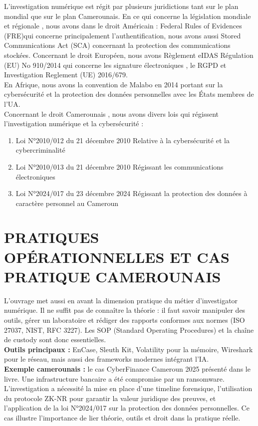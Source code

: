 \documentclass[12pt,a4paper]{article}
\begin{document}
L'investigation numérique est régit par plusieurs juridictions tant sur le plan mondial que sur le plan Camerounais. En ce qui concerne la législation mondiale et régionale , nous avons dans le droit Américain : \og Federal Rules of Evidences (FRE)\fg qui concerne principalement l'authentification, nous avons aussi \og Stored Communications Act (SCA) \fg concernant la protection des communications stockées. Concernant le droit Européen, nous avons \og Règlement eIDAS Régulation (EU) No 910/2014 qui concerne les signature électroniques , le \og RGPD  et Investigation Reglement (UE) 2016/679\fg.\\
 En Afrique, nous avons la convention de Malabo en 2014 portant sur la cybersécurité et la protection des données personnelles avec les États membres de l'UA.\\
 Concernant le droit Camerounais , nous avons divers lois qui régissent l'investigation numérique et la cybersécurité :
 \begin{enumerate}
 	\item  Loi N°2010/012 du 21 décembre 2010 Relative à la cybersécurité et la cybercriminalité \\
 	\item Loi N°2010/013 du 21 décembre 2010 Régissant les communications électroniques \\
 	\item Loi N°2024/017 du 23 décembre 2024 Régissant la protection des données à caractère personnel au Cameroun
 \end{enumerate}
 
 \section{PRATIQUES OPÉRATIONNELLES ET CAS PRATIQUE CAMEROUNAIS}
 L’ouvrage met aussi en avant la dimension pratique du métier d’investigator numérique. 
 Il ne suffit pas de connaître la théorie : il faut savoir manipuler des outils, gérer un laboratoire et rédiger des rapports conformes aux normes (ISO 27037, NIST, RFC 3227). 
 Les SOP (Standard Operating Procedures) et la chaîne de custody sont donc essentielles. \\
 
 \textbf{Outils principaux :} EnCase, Sleuth Kit, Volatility pour la mémoire, Wireshark pour le réseau, mais aussi des frameworks modernes intégrant l’IA. \\
 
 \textbf{Exemple camerounais :} le cas \og CyberFinance Cameroun 2025 \fg présenté dans le livre. 
 Une infrastructure bancaire a été compromise par un ransomware. 
 L’investigation a nécessité la mise en place d’une timeline forensique, l’utilisation du protocole ZK-NR pour garantir la valeur juridique des preuves, et l’application de la loi N°2024/017 sur la protection des données personnelles. 
 Ce cas illustre l’importance de lier théorie, outils et droit dans la pratique réelle.
 
	
\end{document}
